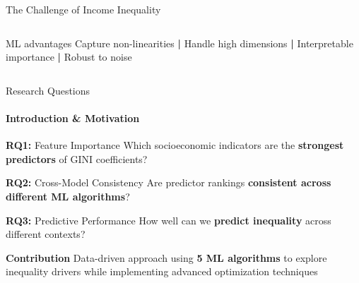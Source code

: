 \documentclass[aspectratio=169,8pt]{beamer}
\begin{document}
\begin{frame}{The Challenge of Income Inequality}
\begin{columns}[totalwidth=\textwidth,T]
            \vspace{0.1cm}
            \begin{alertblock}{ML advantages}
                \small
                Capture non-linearities \textbf{|} Handle high dimensions \textbf{|} Interpretable importance \textbf{|} Robust to noise
            \end{alertblock}
        \end{columns}
    \end{frame}

    \begin{frame}{Research Questions}
        \framesubtitle{Introduction \& Motivation}
        \begin{block}{\textbf{RQ1:} Feature Importance}
            Which socioeconomic indicators are the \textbf{strongest predictors} of GINI coefficients?
        \end{block}

        \begin{block}{\textbf{RQ2:} Cross-Model Consistency}
            Are predictor rankings \textbf{consistent across different ML algorithms}?
        \end{block}

        \begin{block}{\textbf{RQ3:} Predictive Performance}
            How well can we \textbf{predict inequality} across different contexts?
        \end{block}

        \vspace{0.2cm}
        \begin{alertblock}{\textbf{Contribution}}
            Data-driven approach using \textbf{5 ML algorithms} to explore inequality drivers while implementing advanced optimization techniques
        \end{alertblock}
    \end{frame}
\end{document}
